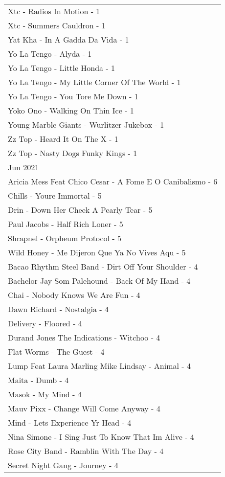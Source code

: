 \documentclass[
]{article}
\begin{document}
\begin{longtable}{l}
Xtc - Radios In Motion - 1 \\ 
Xtc - Summers Cauldron - 1 \\ 
Yat Kha - In A Gadda Da Vida - 1 \\ 
Yo La Tengo - Alyda - 1 \\ 
Yo La Tengo - Little Honda - 1 \\ 
Yo La Tengo - My Little Corner Of The World - 1 \\ 
Yo La Tengo - You Tore Me Down - 1 \\ 
Yoko Ono - Walking On Thin Ice - 1 \\ 
Young Marble Giants - Wurlitzer Jukebox - 1 \\ 
Zz Top - Heard It On The X - 1 \\ 
Zz Top - Nasty Dogs Funky Kings - 1 \\ 
\midrule
\multicolumn{1}{l}{Jun 2021} \\ 
\midrule
Aricia Mess Feat Chico Cesar - A Fome E O Canibalismo - 6 \\ 
Chills - Youre Immortal - 5 \\ 
Drin - Down Her Cheek A Pearly Tear - 5 \\ 
Paul Jacobs - Half Rich Loner - 5 \\ 
Shrapnel - Orpheum Protocol - 5 \\ 
Wild Honey - Me Dijeron Que Ya No Vives Aqu - 5 \\ 
Bacao Rhythm Steel Band - Dirt Off Your Shoulder - 4 \\ 
Bachelor Jay Som Palehound - Back Of My Hand - 4 \\ 
Chai - Nobody Knows We Are Fun - 4 \\ 
Dawn Richard - Nostalgia - 4 \\ 
Delivery - Floored - 4 \\ 
Durand Jones The Indications - Witchoo - 4 \\ 
Flat Worms - The Guest - 4 \\ 
Lump Feat Laura Marling Mike Lindsay - Animal - 4 \\ 
Maita - Dumb - 4 \\ 
Masok - My Mind - 4 \\ 
Mauv Pixx - Change Will Come Anyway - 4 \\ 
Mind - Lets Experience Yr Head - 4 \\ 
Nina Simone - I Sing Just To Know That Im Alive - 4 \\ 
Rose City Band - Ramblin With The Day - 4 \\ 
Secret Night Gang - Journey - 4 \\ 

\end{longtable}
\end{document}
